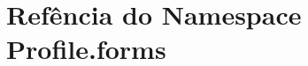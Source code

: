 \hypertarget{namespaceProfile_1_1forms}{\section{Refência do Namespace Profile.\-forms}
\label{de/d77/namespaceProfile_1_1forms}
}
